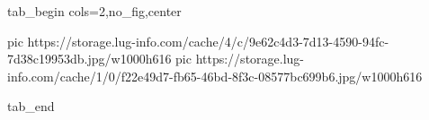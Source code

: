  
 
 
 
 


\ifcmt
  tab_begin cols=2,no_fig,center

     pic https://storage.lug-info.com/cache/4/c/9e62c4d3-7d13-4590-94fc-7d38c19953db.jpg/w1000h616
		 pic https://storage.lug-info.com/cache/1/0/f22e49d7-fb65-46bd-8f3c-08577bc699b6.jpg/w1000h616

  tab_end
\fi
